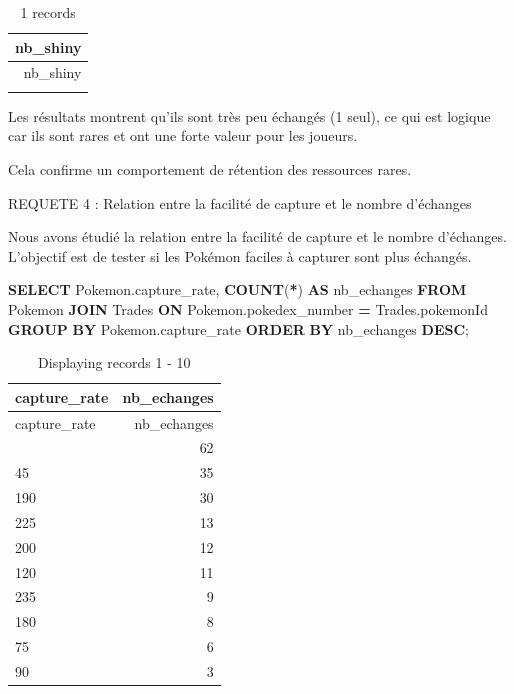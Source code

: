 \documentclass[mstat,12pt]{unswthesis}
\newenvironment{Shaded}{\begin{snugshade}}{\end{snugshade}}
\newcommand{\FunctionTok}[1]{\textcolor[rgb]{0.13,0.29,0.53}{\textbf{#1}}}
\newcommand{\KeywordTok}[1]{\textcolor[rgb]{0.13,0.29,0.53}{\textbf{#1}}}
\newcommand{\NormalTok}[1]{#1}
\newcommand{\OperatorTok}[1]{\textcolor[rgb]{0.81,0.36,0.00}{\textbf{#1}}}
\begin{document}
\begin{longtable}[]{@{}r@{}}
\caption{1 records}\tabularnewline
\toprule\noalign{}
nb\_shiny \\
\midrule\noalign{}
\endfirsthead
\toprule\noalign{}
nb\_shiny \\
\midrule\noalign{}
\endhead
\bottomrule\noalign{}
\endlastfoot
1 \\
\end{longtable}

Les résultats montrent qu'ils sont très peu échangés (1 seul), ce qui
est logique car ils sont rares et ont une forte valeur pour les joueurs.

Cela confirme un comportement de rétention des ressources rares.

\bigskip

REQUETE 4 : Relation entre la facilité de capture et le nombre
d'échanges

\bigskip

Nous avons étudié la relation entre la facilité de capture et le nombre
d'échanges. L'objectif est de tester si les Pokémon faciles à capturer
sont plus échangés.

\begin{Shaded}
\begin{Highlighting}[]
\KeywordTok{SELECT}\NormalTok{ Pokemon.capture\_rate, }\FunctionTok{COUNT}\NormalTok{(}\OperatorTok{*}\NormalTok{) }\KeywordTok{AS}\NormalTok{ nb\_echanges }
\KeywordTok{FROM}\NormalTok{ Pokemon }
\KeywordTok{JOIN}\NormalTok{ Trades }\KeywordTok{ON}\NormalTok{ Pokemon.pokedex\_number }\OperatorTok{=}\NormalTok{ Trades.pokemonId }
\KeywordTok{GROUP} \KeywordTok{BY}\NormalTok{ Pokemon.capture\_rate }
\KeywordTok{ORDER} \KeywordTok{BY}\NormalTok{ nb\_echanges }\KeywordTok{DESC}\NormalTok{;}
\end{Highlighting}
\end{Shaded}

\begin{longtable}[]{@{}lr@{}}
\caption{Displaying records 1 - 10}\tabularnewline
\toprule\noalign{}
capture\_rate & nb\_echanges \\
\midrule\noalign{}
\endfirsthead
\toprule\noalign{}
capture\_rate & nb\_echanges \\
\midrule\noalign{}
\endhead
\bottomrule\noalign{}
\endlastfoot
255 & 62 \\
45 & 35 \\
190 & 30 \\
225 & 13 \\
200 & 12 \\
120 & 11 \\
235 & 9 \\
180 & 8 \\
75 & 6 \\
90 & 3 \\
\end{longtable}
\end{document}

